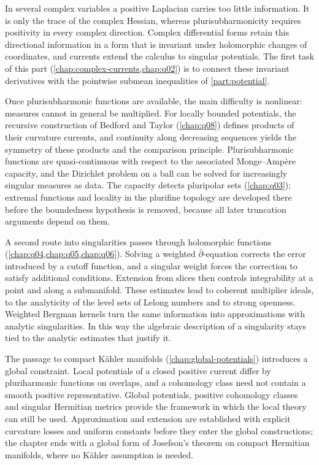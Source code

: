 \label{intro:pluripotential}

In several complex variables a positive Laplacian carries too little information. It is only the trace of the complex Hessian, whereas plurisubharmonicity requires positivity in every complex direction. Complex differential forms retain this directional information in a form that is invariant under holomorphic changes of coordinates, and currents extend the calculus to singular potentials. The first task of this part (\cref{chap:complex-currents,chap:q02}) is to connect these invariant derivatives with the pointwise submean inequalities of \cref{part:potential}.

Once plurisubharmonic functions are available, the main difficulty is nonlinear: measures cannot in general be multiplied. For locally bounded potentials, the recursive construction of Bedford and Taylor (\cref{chap:q08}) defines products of their curvature currents, and continuity along decreasing sequences yields the symmetry of these products and the comparison principle. Plurisubharmonic functions are quasi-continuous with respect to the associated Monge--Amp\`ere capacity, and the Dirichlet problem on a ball can be solved for increasingly singular measures as data. The capacity detects pluripolar sets (\cref{chap:q03}); extremal functions and locality in the plurifine topology are developed there before the boundedness hypothesis is removed, because all later truncation arguments depend on them.

A second route into singularities passes through holomorphic functions (\cref{chap:q04,chap:q05,chap:q06}). Solving a weighted $\bar\partial$-equation corrects the error introduced by a cutoff function, and a singular weight forces the correction to satisfy additional conditions. Extension from slices then controls integrability at a point and along a submanifold. These estimates lead to coherent multiplier ideals, to the analyticity of the level sets of Lelong numbers and to strong openness. Weighted Bergman kernels turn the same information into approximations with analytic singularities. In this way the algebraic description of a singularity stays tied to the analytic estimates that justify it.

The passage to compact K\"ahler manifolds (\cref{chap:global-potentials}) introduces a global constraint. Local potentials of a closed positive current differ by pluriharmonic functions on overlaps, and a cohomology class need not contain a smooth positive representative. Global potentials, positive cohomology classes and singular Hermitian metrics provide the framework in which the local theory can still be used. Approximation and extension are established with explicit curvature losses and uniform constants before they enter the global constructions; the chapter ends with a global form of Josefson's theorem on compact Hermitian manifolds, where no K\"ahler assumption is needed.

